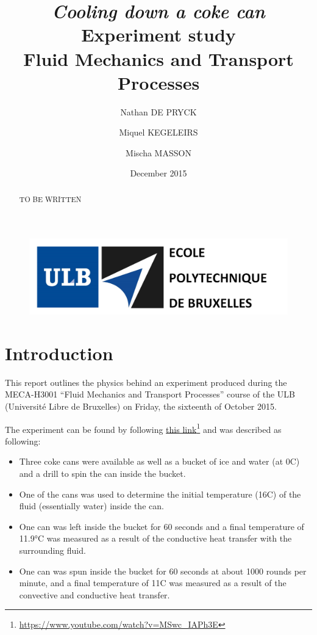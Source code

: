 \documentclass{report}
\title{\Huge\emph{Cooling down a coke can}\\
	\LARGE Experiment study\\
	\vspace{11pt}
	\normalsize Fluid Mechanics and Transport Processes}
\date{December 2015}
\author{Nathan DE PRYCK \and Miquel KEGELEIRS \and Mischa MASSON}
\begin{document}
	
	\begin{figure}[t]
		\includegraphics[width=15cm]{img/entete.PNG}
	\end{figure}
	
	\maketitle
	
	\renewcommand{\abstractname}{``Cooling down a coke can'' \\Experiment study by Nathan De Pryck, Miquel Kegeleirs and Mischa Masson\\ Université Libre de Bruxelles\\2015-2016.}
	
	\BgThispage
	
	\begin{abstract}
		TO BE WRITTEN
	\end{abstract}
	
	\clearpage
	
	
	\tableofcontents
	
	\chapter{Introduction}\label{intro}
	
	This report outlines the physics behind an experiment produced during the MECA-H3001 ``Fluid Mechanics and Transport Processes'' course of the ULB (Université Libre de Bruxelles) on Friday, the sixteenth of October 2015.
	
	The experiment can be found by following \hyperref{https://www.youtube.com/watch?v=MSwc_IAPh3E}{}{}{this link}\footnote{\url{https://www.youtube.com/watch?v=MSwc_IAPh3E}} and was described as following:
	
	\begin{itemize}
		\item Three coke cans were available as well as a bucket of ice and water (at 0\textdegree C) and a drill to spin the	can inside the bucket.
		\item One of the cans was used to determine the initial temperature (16\textdegree C) of the fluid (essentially water) inside the can.
		\item One can was left inside the bucket for 60 seconds and a final temperature of 11.9°C was measured as a result of the conductive heat transfer with the surrounding fluid.
		\item One can was spun inside the bucket for 60 seconds at about 1000 rounds per minute, and a final temperature of 11\textdegree C was measured as a result of the convective and conductive heat transfer.
	\end{itemize}
	
\end{document}

